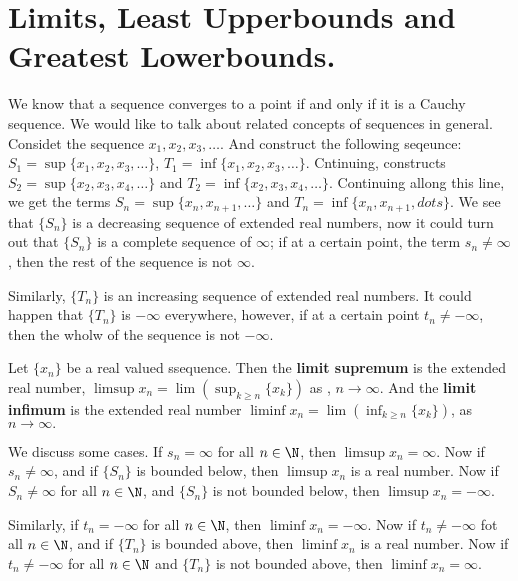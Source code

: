 
\section{Limits, Least Upperbounds and Greatest Lowerbounds.}\hspace{10mm}

We know that a sequence converges to a point if and only if it is a Cauchy 
sequence. We would like to talk about related concepts of sequences in general.
Considet the sequence $x_1,x_2,x_3, \dots$. And construct the following seqeunce: 
$S_1=\sup\{x_1,x_2,x_3, \dots\}$, $T_1=\inf\{x_1,x_2,x_3, \dots\}$. Cntinuing, 
constructs $S_2=\sup\{x_2,x_3,x_4, \dots\}$ and $T_2=\inf\{x_2,x_3,x_4, \dots\}$.
Continuing allong this line, we get the terms $S_n=\sup\{x_n,x_{n+1}, \dots\}$ and 
$T_n=\inf\{x_n,x_{n+1}, dots\}$. We see that  $\{S_n\}$ is a decreasing sequence 
of extended real numbers, now it could turn out that  $\{S_n\}$ is a complete 
sequence of  $\infty$; if at a certain point, the term  $s_n \neq \infty$, then 
the rest of the sequence is  not  $\infty$.

Similarly,  $\{T_n\}$ is an increasing sequence of extended real numbers. It could 
happen that  $\{T_n\}$ is  $-\infty$ everywhere, however, if at a certain point 
$t_n \neq -\infty$, then the wholw of the sequence is not  $-\infty $.

\begin{definition}
    Let $\{x_n\}$ be a real valued ssequence. Then the \textbf{limit supremum} is 
    the extended real number, $\limsup{x_n}=\lim(\sup_{k \geq n}\{x_k\})$ as , 
    $n \rightarrow \infty$. And the \textbf{limit infimum} is the extended real number $\liminf{x_n} 
    = \lim(\inf_{k \geq n}\{x_k\})$, as $n \rightarrow \infty.$
\end{definition}

We discuss some cases. If $s_n=\infty$ for all  $n \in \N$, then  $\limsup{x_n}=\infty$.
Now if  $s_n \neq \infty$, and if  $\{S_n\}$ is bounded below, then  $\limsup{x_n}$ 
is a real number. Now if  $S_n \neq \infty$ for all  $n \in \N$, and  $\{S_n\}$ 
is not bounded below, then  $\limsup{x_n}=-\infty$.

Similarly, if  $t_n=-\infty$ for all  $n \in \N$, then  $\liminf{x_n}=-\infty$. 
Now if  $t_n \neq -\infty$ fot all  $n \in \N$, and if  $\{T_n\}$ is bounded above, 
then  $\liminf{x_n}$ is a real number. Now if  $t_n \neq -\infty$ for all  $n \in \N$ 
and  $\{T_n\}$ is not bounded above, then  $\liminf{x_n}=\infty$.

